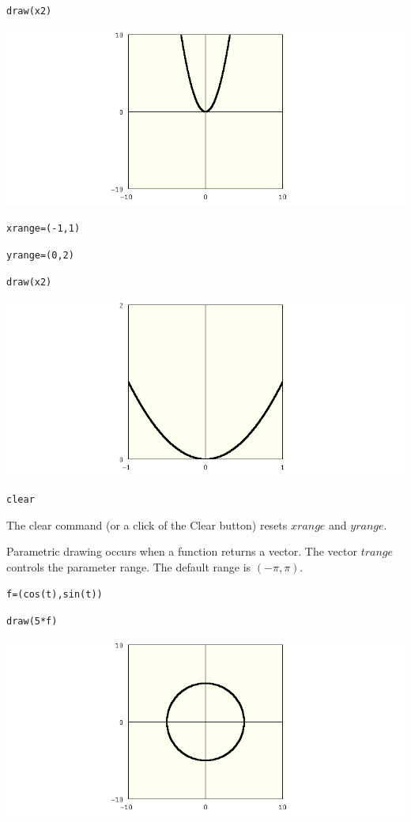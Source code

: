 \documentclass[12pt,openany]{report}
\begin{document}
\medskip
{\tt draw(x{}2)}

\medskip
\noindent
\includegraphics[scale=0.5]{parabola.png}

{\tt xrange=(-1,1)}

{\tt yrange=(0,2)}

{\tt draw(x{}2)}

\medskip
\noindent
\includegraphics[scale=0.5]{parabola2.png}

{\tt clear}

\medskip
\noindent
The clear command (or a click of the Clear button)
resets $xrange$ and $yrange$.

\newpage

\noindent
Parametric drawing occurs when a function returns a vector.
The vector $trange$ controls the parameter range.
The default range is $(-\pi,\pi)$.

\medskip
{\tt f=(cos(t),sin(t))}

{\tt draw(5*f)}

\medskip
\noindent
\includegraphics[scale=0.5]{circle.png}
\end{document}
